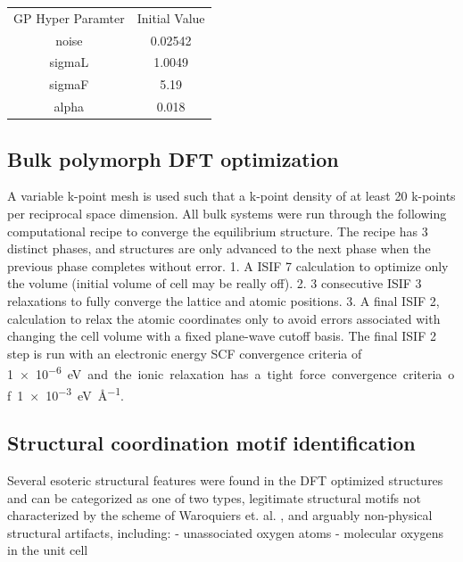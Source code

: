 \begin{table}[htbp]
\centering
\begin{tabular}{cc}
  GP Hyper Paramter & Initial Value \\
  noise & 0.02542 \\
  sigmaL & 1.0049 \\
  sigmaF & 5.19 \\
  alpha & 0.018
\end{tabular}
\end{table}



\subsection{Bulk polymorph DFT optimization}  %
%
%
A variable k-point mesh is used such that a k-point density of at least \num{20} k-points per reciprocal space dimension.
%
All bulk systems were run through the following computational recipe to converge the equilibrium structure.
%
The recipe has \num{3} distinct phases, and structures are only advanced to the next phase when the previous phase completes without error.
%
1. A ISIF \num{7} calculation to optimize only the volume (initial volume of cell may be really off).
%
2. \num{3} consecutive ISIF \num{3} relaxations to fully converge the lattice and atomic positions.
%
3. A final ISIF \num{2}, calculation to relax the atomic coordinates only to avoid errors associated with changing the cell volume with a fixed plane-wave cutoff basis.
%
The final ISIF \num{2} step is run with an electronic energy SCF convergence criteria of \SI{1e-6} eV and the ionic relaxation has a tight force convergence criteria of \SI{1e-3}{\electronvolt\per\angstrom}.


\subsection{Structural coordination motif identification} %
%
Several esoteric structural features were found in the DFT optimized structures and can be categorized as one of two types,
legitimate structural motifs not characterized by the scheme of Waroquiers et. al. \cite{Waroquiers2017}, and arguably non-physical structural artifacts, including:
- unassociated oxygen atoms
- molecular oxygens in the unit cell


